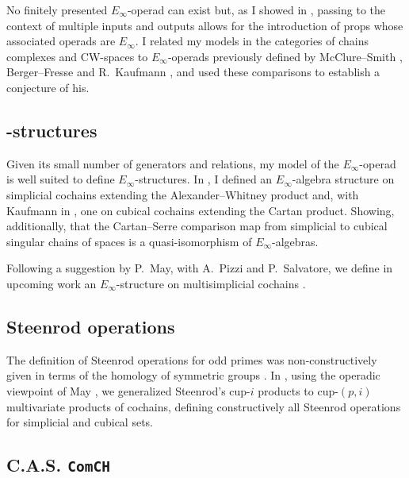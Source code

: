 No finitely presented $E_\infty$-operad can exist but, as I showed in \cite{medina2020prop1, medina2018prop2}, passing to the context of multiple inputs and outputs allows for the introduction of props whose associated operads are $E_\infty$.
I related my models in the categories of chains complexes and CW-spaces to $E_\infty$-operads previously defined by McClure--Smith \cite{mcclure2003multivariable}, Berger--Fresse \cite{berger2004combinatorial} and R.~Kaufmann \cite{kaufmann2009dimension}, and used these comparisons to establish a conjecture of his.

\subsection{\pdfEinfty-structures}

Given its small number of generators and relations, my model of the $E_\infty$-operad is well suited to define $E_{\infty}$-structures.
In \cite{medina2020prop1}, I defined an $E_\infty$-algebra structure on simplicial cochains extending the Alexander--Whitney product and, with Kaufmann in \cite{medina2021cubical}, one on cubical cochains extending the Cartan product.
Showing, additionally, that the Cartan--Serre comparison map from simplicial to cubical singular chains of spaces is a quasi-isomorphism of $E_\infty$-algebras.

Following a suggestion by P.~May, with A.~Pizzi and P.~Salvatore, we define in upcoming work an $E_\infty$-structure on multisimplicial cochains \cite{medina2021multisimplicial}.

\subsection{Steenrod operations} \label{ss:may steenrod}

The definition of Steenrod operations for odd primes was non-constructively given in terms of the homology of symmetric groups \cite{steenrod1952reduced, steenrod1962cohomology}.
In \cite{medina2020maysteenrod}, using the operadic viewpoint of May \cite{may1970general}, we generalized Steenrod's cup-$i$ products to cup-$(p,i)$ multivariate products of cochains, defining constructively all Steenrod operations for simplicial and cubical sets.

\subsection{C.A.S. \texttt{ComCH}}

